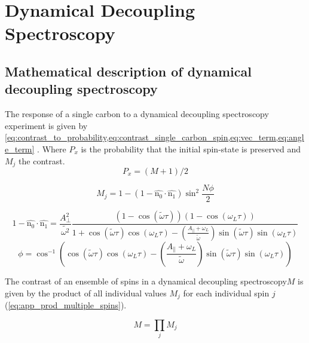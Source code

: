 \chapter{Dynamical Decoupling Spectroscopy}

\section{Mathematical description of dynamical decoupling spectroscopy}
\label{sec:mathematical_description_dd_spectro}


The response of a single carbon to a dynamical decoupling spectroscopy experiment is given by \cref{eq:contrast_to_probability,eq:contrast_single_carbon_spin,eq:vec_term,eq:angle_term} \citep{Taminiau2012Detection}. Where $P_x$ is the probability that the initial spin-state is preserved and $M_j$ the contrast.
\begin{equation}
\label{eq:contrast_to_probability}
P_x = (M+1)/2
\end{equation}

\begin{equation}
\label{eq:contrast_single_carbon_spin}
M_j = 1-(1 - \hat{\bm{\mathrm{n_0}}} \cdot \hat{\bm{\mathrm{n_1}}}) \sin^2 \frac{N\phi}{2}
\end{equation}

\begin{equation}
\label{eq:vec_term}
    1 - \hat{\bm{\mathrm{n_0}}} \cdot \hat{\bm{\mathrm{n_1}}} =  \frac{A_\perp ^2}{\tilde{\omega^2}} \frac{(1- \cos{(\tilde{\omega} \tau)})(1-\cos{(\omega_L \tau)})} {1 +\cos{(\tilde{\omega} \tau)}\cos{(\omega_L \tau)} - (\frac{ A_ \parallel + \omega_L }{ \tilde{ \omega}}) \sin{(\tilde{\omega} \tau)}\sin{(\omega_L \tau)}}
\end{equation}
\begin{equation}
\label{eq:angle_term}
    \phi =  \cos^{-1}\left(\cos(\tilde{\omega} \tau) \cos(\omega_L \tau)-\left(\frac{ A_ \parallel + \omega_L }{ \tilde{ \omega}}\right) \sin(\tilde{\omega} \tau)\sin(\omega_L \tau)\right)
\end{equation}

The contrast of an ensemble of spins in a dynamical decoupling spectroscopy$M$ is given by the product of all individual values $M_j$ for each individual spin $j$ (\cref{eq:app_prod_multiple_spins}).

\begin{equation}
    M = \prod_{j}{M_j}
    \label{eq:app_prod_multiple_spins}
\end{equation}


